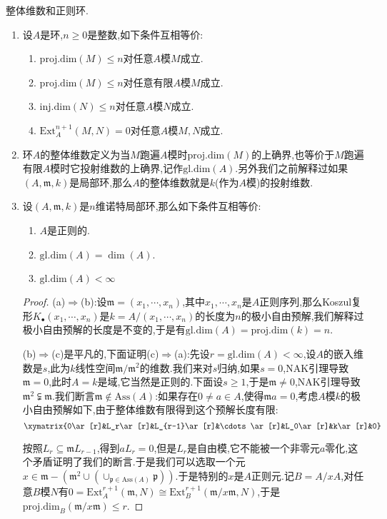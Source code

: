 整体维数和正则环.
\begin{enumerate}
	\item 设$A$是环,$n\ge0$是整数,如下条件互相等价:
	\begin{enumerate}
		\item $\mathrm{proj.dim}(M)\le n$对任意$A$模$M$成立.
		\item $\mathrm{proj.dim}(M)\le n$对任意有限$A$模$M$成立.
		\item $\mathrm{inj.dim}(N)\le n$对任意$A$模$N$成立.
		\item $\mathrm{Ext}_A^{n+1}(M,N)=0$对任意$A$模$M,N$成立.
	\end{enumerate}
    \item 环$A$的整体维数定义为当$M$跑遍$A$模时$\mathrm{proj.dim}(M)$的上确界,也等价于$M$跑遍有限$A$模时它投射维数的上确界,记作$\mathrm{gl.dim}(A)$.另外我们之前解释过如果$(A,\mathfrak{m},k)$是局部环,那么$A$的整体维数就是$k$(作为$A$模)的投射维数.
    \item 设$(A,\mathfrak{m},k)$是$n$维诺特局部环,那么如下条件互相等价:
    \begin{enumerate}
    	\item $A$是正则的.
    	\item $\mathrm{gl.dim}(A)=\dim(A)$.
    	\item $\mathrm{gl.dim}(A)<\infty$
    \end{enumerate}
    \begin{proof}
    	
    	(a)$\Rightarrow$(b):设$\mathfrak{m}=(x_1,\cdots,x_n)$,其中$x_1,\cdots,x_n$是$A$正则序列,那么Koszul复形$K_{\bullet}(x_1,\cdots,x_n)$是$k=A/(x_1,\cdots,x_n)$的长度为$n$的极小自由预解,我们解释过极小自由预解的长度是不变的,于是有$\mathrm{gl.dim}(A)=\mathrm{proj.dim}(k)=n$.
    	
    	\qquad
    	
    	(b)$\Rightarrow$(c)是平凡的,下面证明(c)$\Rightarrow$(a):先设$r=\mathrm{gl.dim}(A)<\infty$,设$A$的嵌入维数是$s$,此为$k$线性空间$\mathfrak{m}/\mathfrak{m}^2$的维数.我们来对$s$归纳,如果$s=0$,NAK引理导致$\mathfrak{m}=0$,此时$A=k$是域,它当然是正则的.下面设$s\ge1$,于是$\mathfrak{m}\not=0$,NAK引理导致$\mathfrak{m}^2\subsetneqq\mathfrak{m}$.我们断言$\mathfrak{m}\not\in\mathrm{Ass}(A)$:如果存在$0\not=a\in A$,使得$\mathfrak{m}a=0$,考虑$A$模$k$的极小自由预解如下,由于整体维数有限得到这个预解长度有限:
    	$$\xymatrix{0\ar[r]&L_r\ar[r]&L_{r-1}\ar[r]&\cdots\ar[r]&L_0\ar[r]&k\ar[r]&0}$$
    	
    	按照$L_r\subseteq\mathfrak{m}L_{r-1}$,得到$aL_r=0$,但是$L_r$是自由模,它不能被一个非零元$a$零化,这个矛盾证明了我们的断言.于是我们可以选取一个元$x\in\mathfrak{m}-\left(\mathfrak{m}^2\cup\left(\cup_{\mathfrak{p}\in\mathrm{Ass}(A)}\mathfrak{p}\right)\right)$.于是特别的$x$是$A$正则元.记$B=A/xA$,对任意$B$模$N$有$0=\mathrm{Ext}_A^{r+1}(\mathfrak{m},N)\cong\mathrm{Ext}_B^{r+1}(\mathfrak{m}/x\mathfrak{m},N)$,于是$\mathrm{proj.dim}_B(\mathfrak{m}/x\mathfrak{m})\le r$.
    	

\end{proof}
\end{enumerate}
